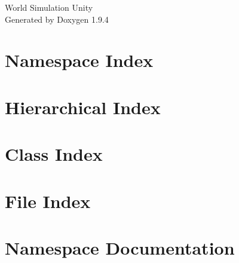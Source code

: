\documentclass[twoside]{book}
\newcommand{\+}{\discretionary{\mbox{\scriptsize$\hookleftarrow$}}{}{}}
\newcommand{\clearemptydoublepage}{%
    \newpage{\pagestyle{empty}\cleardoublepage}%
  }
\begin{document}
  \raggedbottom
    \hypersetup{pageanchor=false,
                bookmarksnumbered=true,
                pdfencoding=unicode
               }
  \begin{titlepage}
  \vspace*{7cm}
  \begin{center}%
  {\Large World Simulation Unity}\\
  \vspace*{1cm}
  {\large Generated by Doxygen 1.9.4}\\
  \end{center}
  \end{titlepage}
  \clearemptydoublepage
  \tableofcontents
  \clearemptydoublepage
  \hypersetup{pageanchor=true}
\chapter{Namespace Index}

\chapter{Hierarchical Index}

\chapter{Class Index}

\chapter{File Index}

\chapter{Namespace Documentation}





















\end{document}
